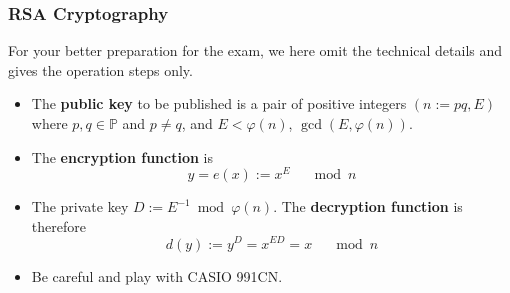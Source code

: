 \documentclass{beamer}
\begin{document}
\begin{frame}
    \frametitle{RSA Cryptography}
    For your better preparation for the exam, we here omit the technical details 
    and gives the operation steps only.\\\vv
    \begin{itemize}
        \item The \textbf{public key} to be published is a pair of positive integers 
        $(n:=p q, E)$ where $p, q \in \mathbb{P}$ and 
        $p \neq q$, and $E<\varphi(n)$, $\operatorname{gcd}(E, \varphi(n))$.
        \item The \textbf{encryption function} is
        $$
        y=e(x):=x^{E} \quad \mod{n}
        $$
        \item The private key $D:=E^{-1} \bmod \varphi(n)$. 
        The \textbf{decryption function} is therefore
        $$
        d(y):=y^{D}=x^{E D}=x \quad\mod{n}
        $$
        \item Be careful and play with CASIO 991CN.
    \end{itemize}
\end{frame}
\end{document}
